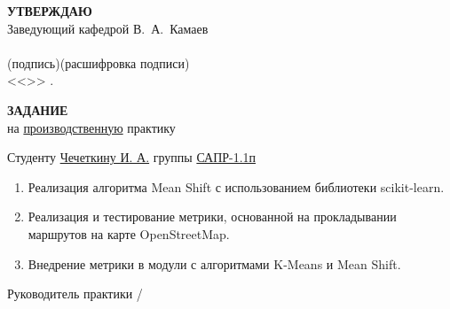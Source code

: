\begin{titlepage}
    \begin{flushright}
        \textbf{\MakeUppercase{Утверждаю}}\hspace{4.5cm}~\\
        Заведующий кафедрой В.~А.~Камаев \\
        \underline{\hspace{3.2cm}} \underline{\hspace{4.5cm}}\\
        \vspace{-0.2cm}\footnotesize(подпись)\hspace{1.4cm}(расшифровка подписи)\hspace{0.4cm}~\normalsize\\
        <<\underline{\hspace{2cm}}>>\underline{\hspace{4cm}} \the{}.
    \end{flushright}
    \vspace{2cm}
    \begin{center}
        \textbf{\MakeUppercase{Задание}}\\
        на \underline{производственную} практику
    \end{center}
    \vspace{1cm}
    Студенту \underline{Чечеткину И. А.} группы \underline{САПР-1.1п}\\[1cm]

    \begin{enumerate}
        \item Реализация алгоритма Mean Shift с использованием библиотеки scikit-learn.
        \item Реализация и тестирование метрики, основанной на прокладывании маршрутов на карте
            OpenStreetMap.
        \item Внедрение метрики в модули с алгоритмами K-Means и Mean Shift.
    \end{enumerate}

    \vspace{\fill}
    \begin{flushright}
        Руководитель практики \underline{\hspace{5cm}} / \underline{\hspace{3cm}}
    \end{flushright}
\end{titlepage}

